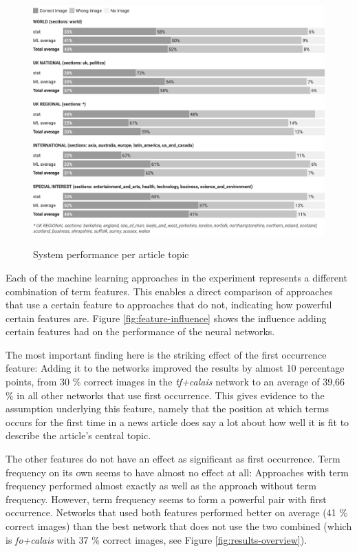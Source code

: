 \documentclass[11pt,a4paper,twoside]{article}
\begin{document}
\begin{figure}[h]
    \caption{System performance per article topic}
    \centering
    \includegraphics[width=\columnwidth]{fig-perf-per-topic.png}
    \label{fig:perf-per-topic}
\end{figure}

\clearpage

Each of the machine learning approaches in the experiment represents a different combination of term features. This enables a direct comparison of approaches that use a certain feature to approaches that do not, indicating how powerful certain features are. Figure \ref{fig:feature-influence} shows the influence adding certain features had on the performance of the neural networks. 

The most important finding here is the striking effect of the first occurrence feature: Adding it to the networks improved the results by almost 10 percentage points, from 30 \% correct images in the \emph{tf+calais} network to an average of 39,66 \% in all other networks that use first occurrence. This gives evidence to the assumption underlying this feature, namely that the position at which terms occurs for the first time in a news article does say a lot about how well it is fit to describe the article's central topic.

The other features do not have an effect as significant as first occurrence. Term frequency on its own seems to have almost no effect at all: Approaches with term frequency performed almost exactly as well as the approach without term frequency. However, term frequency seems to form a powerful pair with first occurrence. Networks that used both features performed better on average (41 \% correct images) than the best network that does not use the two combined (which is \emph{fo+calais} with 37 \% correct images, see Figure \ref{fig:results-overview}).
\end{document}
